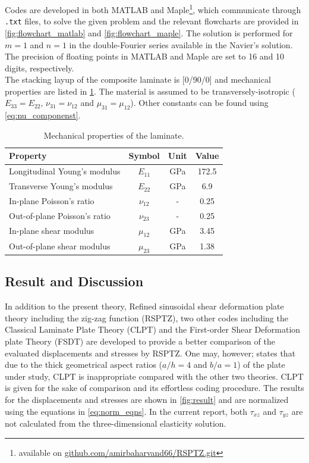 \documentclass{article}
\begin{document}
Codes are developed in both MATLAB and Maple\footnote{available on \url{github.com/amirbaharvand66/RSPTZ.git}}, which communicate through \texttt{.txt} files, to solve the given problem and the relevant flowcharts are provided in \cref{fig:flowchart_matlab} and \cref{fig:flowchart_maple}. The solution is performed for $m=1$ and $n=1$ in the double-Fourier series available in the Navier's solution. The precision of floating points in MATLAB and Maple are set to 16 and 10 digits, respectively. \\

The stacking layup of the composite laminate is [0/90/0] and mechanical properties are listed in \cref{tab:mech_prop}. The material is assumed to be transversely-isotropic ($E_{33}=E_{22}$, $\nu_{31} = \nu_{12}$ and $\mu_{31} = \mu_{12}$). Other constants can be found using \cref{eq:nu_componenst}.

\begin{table}[H]
\centering
\caption{Mechanical properties of the laminate.}
\begin{tabular}{lccc}
\hline
\textbf{Property}       & \textbf{Symbol}   & \textbf{Unit}   & \textbf{Value} \\ \hline
Longitudinal Young's modulus & $E_{11}$ & GPa & 172.5 \\
Transverse  Young's modulus & $E_{22}$ & GPa & 6.9 \\
In-plane Poisson's ratio & $\nu_{12}$ & - & 0.25 \\
Out-of-plane Poisson's ratio & $\nu_{23}$ & - & 0.25 \\
In-plane shear modulus & $\mu_{12}$ & GPa & 3.45 \\
Out-of-plane shear modulus & $\mu_{23}$ & GPa & 1.38 \\ \hline
\end{tabular}
\label{tab:mech_prop}
\end{table}

\subsection{Result and Discussion}
In addition to the present theory, Refined sinusoidal shear deformation plate theory including the zig-zag function (RSPTZ), two other codes including the Classical Laminate Plate Theory (CLPT) and the First-order Shear Deformation plate Theory (FSDT) are developed to provide a better comparison of the evaluated displacements and stresses by RSPTZ. One may, however; states that due to the thick geometrical aspect ratios ($a/h=4$ and $b/a=1$) of the plate under study, CLPT is inappropriate compared with the other two theories. CLPT is given for the sake of comparison and its effortless coding procedure. The results for the displacements and stresses are shown in \cref{fig:result} and are normalized using the equations in \cref{eq:norm_eqns}. In the current report, both $\tau_{xz}$ and $\tau_{yz}$ are not calculated from the three-dimensional elasticity solution.\\
\end{document}
